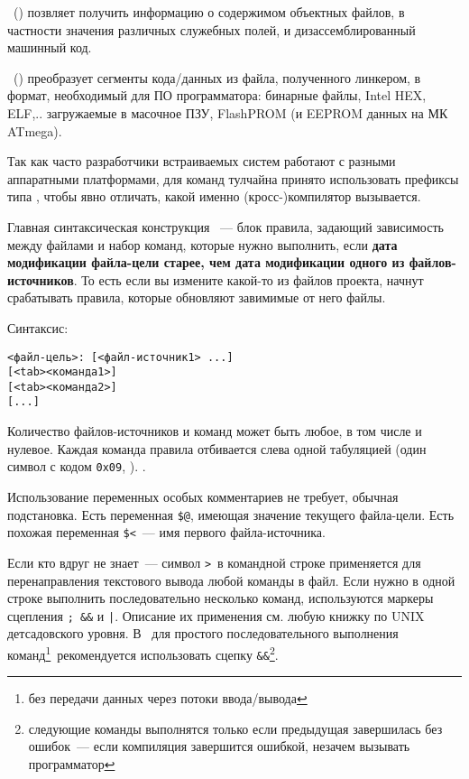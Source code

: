   \ () позвляет получить информацию о содержимом
  объектных файлов, в частности значения различных служебных полей, и
  дизассемблированный машинный код. 
  
  \ () преобразует сегменты кода/данных из файла,
  полученного линкером, в формат, необходимый для ПО программатора: бинарные
  файлы, Intel HEX, ELF,.. загружаемые в масочное ПЗУ, FlashPROM (и EEPROM
  данных на МК ATmega).
  
  \bigskip
  Так как часто разработчики встраиваемых систем работают
  с разными аппаратными платформами, для команд тулчайна
  принято использовать префиксы типа ,
  чтобы явно отличать, какой именно (кросс-)компилятор вызывается.
  
  \bigskip
  Главная синтаксическая конструкция \makefile\ --- блок правила, задающий
  зависимость между файлами и набор команд, которые нужно выполнить, если 
  \textbf{дата
  модификации файла-цели старее, чем дата модификации одного из
  файлов-источников}. То есть если вы измените какой-то из файлов проекта,
  начнут срабатывать правила, которые обновляют завимимые от него файлы.

  Синтаксис:
  
\begin{verbatim}
<файл-цель>: [<файл-источник1> ...]
[<tab><команда1>]
[<tab><команда2>]
[...]
\end{verbatim}

Количество файлов-источников и команд может быть любое, в том числе и нулевое.
Каждая команда правила отбивается слева одной табуляцией (один символ с кодом
\verb|0x09|, ). .

Использование переменных особых комментариев не требует, обычная подстановка.
Есть переменная \verb|$@|, имеющая значение текущего файла-цели. Есть похожая
переменная \verb|$<|\ --- имя первого файла-источника.

Если кто вдруг не знает\ --- символ \verb|>|\ в командной строке применяется для
перенаправления текстового вывода любой команды в файл. Если нужно в одной
строке выполнить последовательно несколько команд, используются маркеры
сцепления \verb|;|\ \verb|&&| и \verb$|$. Описание их применения см. любую
книжку по UNIX детсадовского уровня. В \makefile\ для простого
последовательного выполнения команд\footnote{без передачи данных через потоки
ввода/вывода}\ рекомендуется использовать сцепку \verb|&&|\footnote{следующие
команды выполнятся только если предыдущая завершилась без ошибок\ --- если
компиляция завершится ошибкой, незачем вызывать программатор}.


